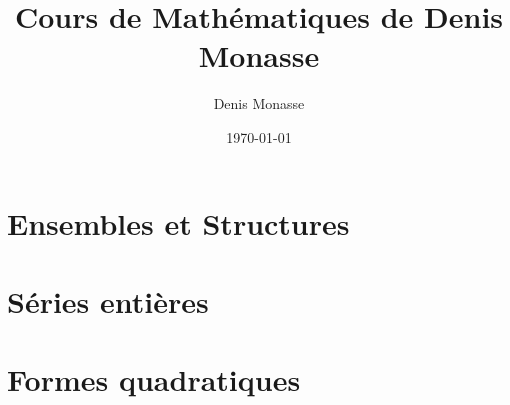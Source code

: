 \documentclass{Math}
\theoremstyle{plain}
\begin{document}
\title{Cours de Mathématiques de Denis Monasse}
\author{Denis Monasse}
\date{\today}
\maketitle

\tableofcontents

\newpage
\part{Ensembles et Structures}


 
 
% 
% 
% 
% 
% 
% 
% 
% 
% 
% 
% 
% 
% 
% 
% 
% 
% 
% 
% 
% 
% 
% 
% 
% 
% 
% 
% 
% 

% 
% 
% 
% 
% 
% 
% 
% 
% 
% 
% 
% 
% 
% 
% 
% 
% 
% 
% 
% 
% 
% 
% 
% 
% 
% 
% 
% 
% 
\newpage
\part{Séries entières}




\newpage
\part{Formes quadratiques}
% 
% 
% 
% 
% 
% 
\end{document}
